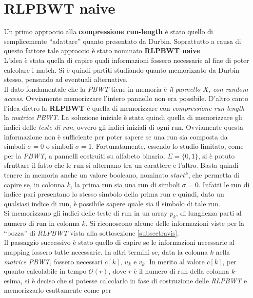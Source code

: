 \section{RLPBWT naive}
\label{secrlpbwtnaive}
Un primo approccio alla \textbf{compressione run-length} è stato quello di
semplicemente ``adattare'' quanto presentato da Durbin. Soprattutto a causa di
questo fattore tale approccio è stato nominato \textbf{RLPBWT naive}.\\
L'idea è stata quella di capire quali informazioni fossero necessarie al fine di
poter calcolare i match. Si è quindi partiti studiando quanto memorizzato da
Durbin stesso, pensando ad eventuali alternative.\\
Il dato fondamentale che la \textit{PBWT} tiene in memoria è \textit{il pannello
  $X$, con random access}. Ovviamente memorizzare l'intero pannello non era
possibile. D'altro canto l'idea dietro la 
\textbf{RLPBWT} è quella di memorizzare con \textit{compressione run-length}
la \textit{matrice PBWT}. La soluzione iniziale è stata quindi quella di
memorizzare gli indici delle \textit{teste di run}, ovvero gli indici iniziali
di ogni run. Ovviamente questa informazione non è sufficiente per poter sapere
se una run sia composta da simboli $\sigma=0$ o simboli
$\sigma=1$. Fortunatamente, essendo lo studio limitato, come per la
\textit{PBWT}, a pannelli costruiti su alfabeto binario, $\Sigma=\{0,1\}$, si è
potuto sfruttare il fatto che le run si alternano tra un carattere e
l'altro. Basta quindi tenere in memoria anche un valore booleano, nominato
$start^k$, che permetta di 
capire se, in colonna $k$, la prima run sia una run di simboli
$\sigma=0$. Infatti le run di 
indice pari presentano lo stesso simbolo della prima run e quindi, dato un
qualsiasi indice di run, è possibile sapere quale sia il simbolo di tale run.\\
Si memorizzano gli indici delle teste di run in un array $p_k$, di lunghezza
parti al numero di run in colonna $k$. Si riconoscono alcune delle informazioni
viste per la ``bozza'' di \textit{RLPBWT} vista alla sottosezione
\ref{subsectravis}.\\ 
Il passaggio successivo è stato quello di capire se le informazioni necessarie
al mapping fossero tutte necessarie. In altri termini se, data la colonna $k$
nella \textit{matrice PBWT}, fossero necessari $c[k]$, $u_k$ e $v_k$. In merito
al valore $c[k]$, per quanto calcolabile in tempo $\mathcal{O}(r)$, dove $r$ è
il numero di run della colonna $k$-esima, si è deciso che si potesse calcolarlo
in fase di costruzione delle \textit{RLPBWT} e memorizzarlo esattamente come per
